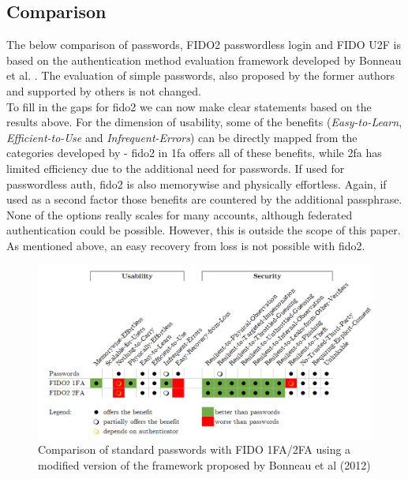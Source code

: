 \subsection{Comparison}
\label{subsec:comparison}

The below comparison of passwords, FIDO2 passwordless login and FIDO U2F is based on the authentication method evaluation framework developed by Bonneau et al. \cite{bonneau2012}. The evaluation of simple passwords, also proposed by the former authors and supported by others \cite{lyastani2020} is not changed.\\
To fill in the gaps for \ac{fido2} we can now make clear statements based on the results above. For the dimension of usability, some of the benefits (\emph{Easy-to-Learn}, \emph{Efficient-to-Use} and \emph{Infrequent-Errors}) can be directly mapped from the categories developed by \cite{nielsen1993} - \ac{fido2} in \ac{1fa} offers all of these benefits, while \ac{2fa} has limited efficiency due to the additional need for passwords. If used for passwordless auth, \ac{fido2} is also memorywise and physically effortless. Again, if used as a second factor those benefits are countered by the additional passphrase. None of the options really scales for many accounts, although federated authentication could be possible. However, this is outside the scope of this paper. As mentioned above, an easy recovery from loss is not possible with \ac{fido2}.

\begin{figure}[!ht]
    \centering
    \includegraphics[width=1.8\columnwidth]{Figures/bonneau_matrix.png}
    \caption[Comparison of Authentication Methods]{Comparison of standard passwords with FIDO 1FA/2FA using a modified version of the framework proposed by Bonneau et al (2012)}
    \label{fig:bonneau_matrix}
\end{figure}

